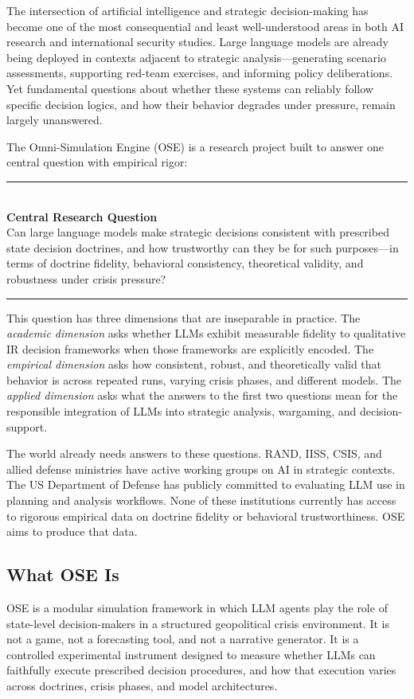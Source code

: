 \documentclass[12pt, a4paper]{article}
\newenvironment{graybox}{%
  \vspace{10pt}%
  \begin{center}%
  \begin{minipage}{0.92\textwidth}%
  \noindent\rule{\textwidth}{0.4pt}\\[4pt]%
}{%
  \\[4pt]\noindent\rule{\textwidth}{0.4pt}%
  \end{minipage}%
  \end{center}%
  \vspace{10pt}%
}
\begin{document}
The intersection of artificial intelligence and strategic decision-making has become one of the most consequential and least well-understood areas in both AI research and international security studies. Large language models are already being deployed in contexts adjacent to strategic analysis---generating scenario assessments, supporting red-team exercises, and informing policy deliberations. Yet fundamental questions about whether these systems can reliably follow specific decision logics, and how their behavior degrades under pressure, remain largely unanswered.

The Omni-Simulation Engine (OSE) is a research project built to answer one central question with empirical rigor:

\begin{graybox}
\textbf{Central Research Question}\\[6pt]
Can large language models make strategic decisions consistent with prescribed state decision doctrines, and how trustworthy can they be for such purposes---in terms of doctrine fidelity, behavioral consistency, theoretical validity, and robustness under crisis pressure?
\end{graybox}

This question has three dimensions that are inseparable in practice. The \textit{academic dimension} asks whether LLMs exhibit measurable fidelity to qualitative IR decision frameworks when those frameworks are explicitly encoded. The \textit{empirical dimension} asks how consistent, robust, and theoretically valid that behavior is across repeated runs, varying crisis phases, and different models. The \textit{applied dimension} asks what the answers to the first two questions mean for the responsible integration of LLMs into strategic analysis, wargaming, and decision-support.

The world already needs answers to these questions. RAND, IISS, CSIS, and allied defense ministries have active working groups on AI in strategic contexts. The US Department of Defense has publicly committed to evaluating LLM use in planning and analysis workflows. None of these institutions currently has access to rigorous empirical data on doctrine fidelity or behavioral trustworthiness. OSE aims to produce that data.

\subsection{What OSE Is}

OSE is a modular simulation framework in which LLM agents play the role of state-level decision-makers in a structured geopolitical crisis environment. It is not a game, not a forecasting tool, and not a narrative generator. It is a controlled experimental instrument designed to measure whether LLMs can faithfully execute prescribed decision procedures, and how that execution varies across doctrines, crisis phases, and model architectures.
\end{document}
